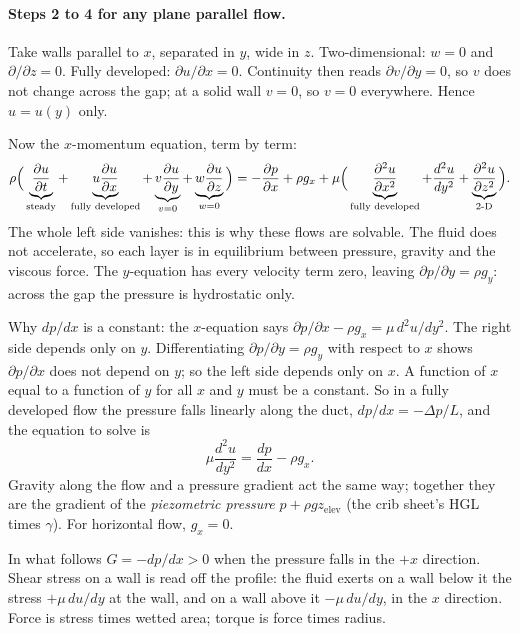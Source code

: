\paragraph{Steps 2 to 4 for any plane parallel flow.} Take walls parallel to $x$, separated in $y$, wide in $z$. Two-dimensional: $w = 0$ and $\partial/\partial z = 0$. Fully developed: $\partial u/\partial x = 0$. Continuity then reads $\partial v/\partial y = 0$, so $v$ does not change across the gap; at a solid wall $v = 0$, so $v = 0$ everywhere. Hence $u = u(y)$ only.

Now the $x$-momentum equation, term by term:
\[
\rho\Big(\underbrace{\frac{\partial u}{\partial t}}_{\text{steady}} + \underbrace{u\frac{\partial u}{\partial x}}_{\text{fully developed}} + \underbrace{v\frac{\partial u}{\partial y}}_{v = 0} + \underbrace{w\frac{\partial u}{\partial z}}_{w = 0}\Big)
= -\frac{\partial p}{\partial x} + \rho g_x + \mu\Big(\underbrace{\frac{\partial^2 u}{\partial x^2}}_{\text{fully developed}} + \frac{d^2 u}{dy^2} + \underbrace{\frac{\partial^2 u}{\partial z^2}}_{\text{2-D}}\Big).
\]
The whole left side vanishes: this is why these flows are solvable. The fluid does not accelerate, so each layer is in equilibrium between pressure, gravity and the viscous force. The $y$-equation has every velocity term zero, leaving $\partial p/\partial y = \rho g_y$: across the gap the pressure is hydrostatic only.

Why $dp/dx$ is a constant: the $x$-equation says $\partial p/\partial x - \rho g_x = \mu\,d^2u/dy^2$. The right side depends only on $y$. Differentiating $\partial p/\partial y = \rho g_y$ with respect to $x$ shows $\partial p/\partial x$ does not depend on $y$; so the left side depends only on $x$. A function of $x$ equal to a function of $y$ for all $x$ and $y$ must be a constant. So in a fully developed flow the pressure falls linearly along the duct, $dp/dx = -\Delta p/L$, and the equation to solve is
\begin{equation}
\mu\frac{d^2u}{dy^2} = \frac{dp}{dx} - \rho g_x .
\label{eq:parallelflow}
\end{equation}
Gravity along the flow and a pressure gradient act the same way; together they are the gradient of the \emph{piezometric pressure} $p + \rho g z_{\text{elev}}$ (the crib sheet's HGL times $\gamma$). For horizontal flow, $g_x = 0$.

In what follows $G = -dp/dx > 0$ when the pressure falls in the $+x$ direction. Shear stress on a wall is read off the profile: the fluid exerts on a wall below it the stress $+\mu\,du/dy$ at the wall, and on a wall above it $-\mu\,du/dy$, in the $x$ direction. Force is stress times wetted area; torque is force times radius.

